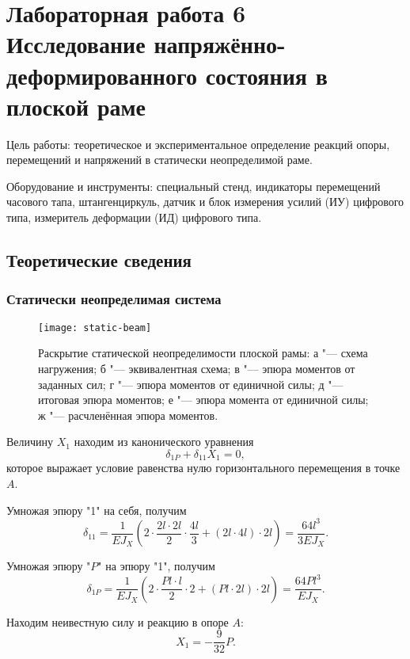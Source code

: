 \section{Лабораторная работа 6 \\
\Large Исследование напряжённо-деформированного состояния в плоской раме}

Цель работы: теоретическое и экспериментальное определение реакций опоры, перемещений и напряжений в статически неопределимой раме.

Оборудование и инструменты: специальный стенд, индикаторы перемещений часового тапа, штангенциркуль, датчик и блок измерения усилий (ИУ) цифрового типа, измеритель деформации (ИД) цифрового типа.

\subsection{Теоретические сведения}

\subsubsection{Статически неопределимая система}

\begin{figure}[!ht]
    \centering
    \texttt{[image: static-beam]}
    \caption{Раскрытие статической неопределимости плоской рамы:
        а "--- схема нагружения;
        б "--- эквивалентная схема;
        в "--- эпюра моментов от заданных сил;
        г "--- эпюра моментов от единичной силы;
        д "--- итоговая эпюра моментов;
        е "--- эпюра момента от единичной силы;
        ж "--- расчленённая эпюра моментов.
    }
    \label{fig:static-beam}
\end{figure}

Величину $X_1$ находим из канонического уравнения
\[
    \delta_{1P} + \delta_{11} X_1 = 0,
\]
которое выражает условие равенства нулю горизонтального перемещения в точке $A$.

Умножая эпюру "1" на себя, получим
\[
    \delta_{11}
    = \frac{1}{E J_X} \left(2 \cdot \frac{2 l \cdot 2 l}{2} \cdot \frac{4 l}{3} + (2 l \cdot 4 l) \cdot 2 l\right)
    = \frac{64 l^3}{3 E J_X}.
\]

Умножая эпюру "$P$" на эпюру "1", получим
\[
    \delta_{1P}
    = \frac{1}{E J_X} \left(2 \cdot \frac{P l \cdot l}{2} \cdot 2 + (P l \cdot 2 l) \cdot 2 l\right)
    = \frac{64 P l^3}{E J_X}.
\]

Находим неивестную силу и реакцию в опоре $A$:
\[
    X_1 = -\frac{9}{32} P.
\]

